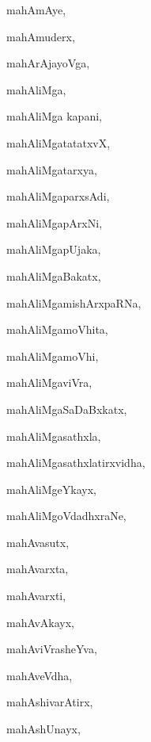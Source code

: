 \begin{multicols}{3}
{\noindent
{mahAmAye}, \pageref{mahAmAye}

\noindent
{mahAmuderx}, \pageref{mahAmuderx}

\noindent
{mahArAjayoVga}, \pageref{mahArAjayoVga}

\noindent
{mahAliMga}, \pageref{mahAliMga}

\noindent
{mahAliMga kapani}, \pageref{mahAliMga kapani}

\noindent
{mahAliMgatatatxvX}, \pageref{mahAliMgatatatxvX}

\noindent
{mahAliMgatarxya}, \pageref{mahAliMgatarxya}

\noindent
{mahAliMgaparxsAdi}, \pageref{mahAliMgaparxsAdi}

\noindent
{mahAliMgapArxNi}, \pageref{mahAliMgapArxNi}

\noindent
{mahAliMgapUjaka}, \pageref{mahAliMgapUjaka}

\noindent
{mahAliMgaBakatx}, \pageref{mahAliMgaBakatx}

\noindent
{mahAliMgamishArxpaRNa}, \pageref{mahAliMgamishArxpaRNa}

\noindent
{mahAliMgamoVhita}, \pageref{mahAliMgamoVhita}

\noindent
{mahAliMgamoVhi}, \pageref{mahAliMgamoVhi}

\noindent
{mahAliMgaviVra}, \pageref{mahAliMgaviVra}

\noindent
{mahAliMgaSaDaBxkatx}, \pageref{mahAliMgaSaDaBxkatx}

\noindent
{mahAliMgasathxla}, \pageref{mahAliMgasathxla}

\noindent
{mahAliMgasathxlatirxvidha}, \pageref{mahAliMgasathxlatirxvidha}

\noindent
{mahAliMgeYkayx}, \pageref{mahAliMgeYkayx}

\noindent
{mahAliMgoVdadhxraNe}, \pageref{mahAliMgoVdadhxraNe}

\noindent
{mahAvasutx}, \pageref{mahAvasutx}

\noindent
{mahAvarxta}, \pageref{mahAvarxta}

\noindent
{mahAvarxti}, \pageref{mahAvarxti}

\noindent
{mahAvAkayx}, \pageref{mahAvAkayx}

\noindent
{mahAviVrasheYva}, \pageref{mahAviVrasheYva}

\noindent
{mahAveVdha}, \pageref{mahAveVdha}

\noindent
{mahAshivarAtirx}, \pageref{mahAshivarAtirx}

\noindent
{mahAshUnayx}, \pageref{mahAshUnayx}

}
\end{multicols}
